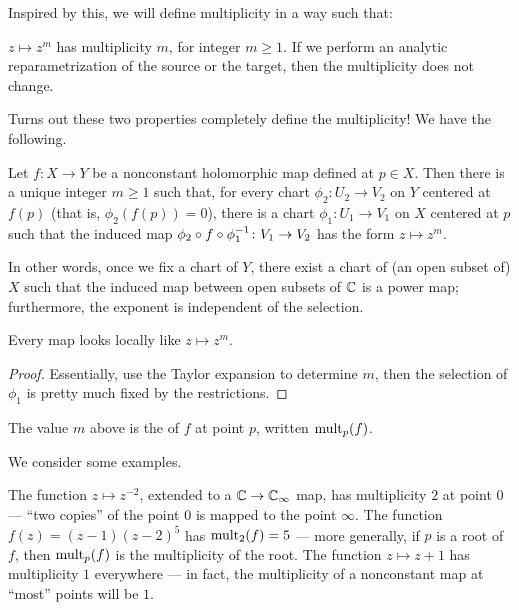 Inspired by this, we will define multiplicity in a way such that:
\begin{itemize}
	\ii $z \mapsto z^m$ has multiplicity $m$, for integer $m \geq 1$.
	\ii If we perform an analytic reparametrization of the source or the target, then the
	multiplicity does not change.
\end{itemize}
Turns out these two properties completely define the multiplicity! We have the following.
\begin{proposition}
	Let $f \colon X \to Y$ be a nonconstant holomorphic map defined at $p \in X$.
	Then there is a unique integer $m \geq 1$ such that, for every chart $\phi_2 \colon U_2 \to V_2$
	on $Y$ centered at $f(p)$ (that is, $\phi_2(f(p)) = 0$),
	there is a chart $\phi_1 \colon U_1 \to V_1$ on $X$ centered at $p$
	such that the induced map $\phi_2 \circ f \circ \phi_1^{-1} \colon V_1 \to V_2$
	has the form $z \mapsto z^m$.
\end{proposition}
In other words, once we fix a chart of $Y$, there exist a chart of (an open subset of) $X$
such that the induced map between open subsets of $\mathbb C$ is a power map;
furthermore, the exponent is independent of the selection.
\begin{moral}
	Every map looks locally like $z \mapsto z^m$.
\end{moral}
\begin{proof}
	Essentially, use the Taylor expansion to determine $m$, then the selection of $\phi_1$ is pretty
	much fixed by the restrictions.
\end{proof}

\begin{definition}
	The value $m$ above is the  of $f$ at point $p$, written $\operatorname{mult}_p(f)$.
\end{definition}

\begin{example}
	We consider some examples.
	\begin{itemize}
		\ii The function $z \mapsto z^{-2}$, extended to a $\mathbb C \to \mathbb C_\infty$ map,
		has multiplicity $2$ at point $0$ --- ``two copies'' of the point $0$ is mapped to the point
		$\infty$.
		\ii The function $f(z) = (z-1) (z-2)^5$ has $\operatorname{mult}_2(f) = 5$ --- more generally,
		if $p$ is a root of $f$, then $\operatorname{mult}_p(f)$ is the multiplicity of the root.
		\ii The function $z \mapsto z + 1$ has multiplicity $1$ everywhere --- in fact,
		the multiplicity of a nonconstant map at ``most'' points will be $1$.
	\end{itemize}
\end{example}

